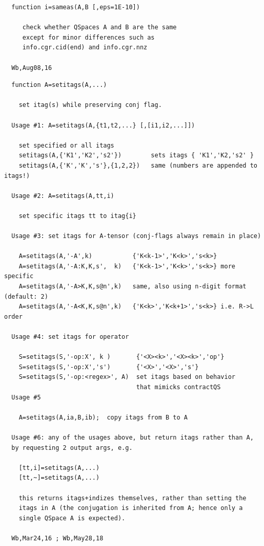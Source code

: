 \documentclass[twoside,12pt]{article}
\begin{document}

\begin{verbatim}
  function i=sameas(A,B [,eps=1E-10])
 
     check whether QSpaces A and B are the same
     except for minor differences such as 
     info.cgr.cid(end) and info.cgr.nnz
 
  Wb,Aug08,16
\end{verbatim}

\pagebreak[3]



\begin{verbatim}
  function A=setitags(A,...)
 
    set itag(s) while preserving conj flag.
 
  Usage #1: A=setitags(A,{t1,t2,...} [,[i1,i2,...]])
 
    set specified or all itags
    setitags(A,{'K1','K2','s2'})        sets itags { 'K1','K2,'s2' }
    setitags(A,{'K','K','s'},{1,2,2})   same (numbers are appended to itags!)
 
  Usage #2: A=setitags(A,tt,i)
 
    set specific itags tt to itag{i}
 
  Usage #3: set itags for A-tensor (conj-flags always remain in place)
 
    A=setitags(A,'-A',k)           {'K<k-1>','K<k>','s<k>}
    A=setitags(A,'-A:K,K,s',  k)   {'K<k-1>','K<k>','s<k>} more specific
    A=setitags(A,'-A>K,K,s@n',k)   same, also using n-digit format (default: 2)
    A=setitags(A,'-A<K,K,s@n',k)   {'K<k>','K<k+1>','s<k>} i.e. R->L order
 
  Usage #4: set itags for operator
 
    S=setitags(S,'-op:X', k )       {'<X><k>','<X><k>','op'}
    S=setitags(S,'-op:X','s')       {'<X>','<X>','s'}
    S=setitags(S,'-op:<regex>', A)  set itags based on behavior
                                    that mimicks contractQS
  Usage #5
 
    A=setitags(A,ia,B,ib);  copy itags from B to A
 
  Usage #6: any of the usages above, but return itags rather than A,
  by requesting 2 output args, e.g.
 
    [tt,i]=setitags(A,...)
    [tt,~]=setitags(A,...)
 
    this returns itags+indizes themselves, rather than setting the
    itags in A (the conjugation is inherited from A; hence only a
    single QSpace A is expected).
 
  Wb,Mar24,16 ; Wb,May28,18
\end{verbatim}
\end{document}
